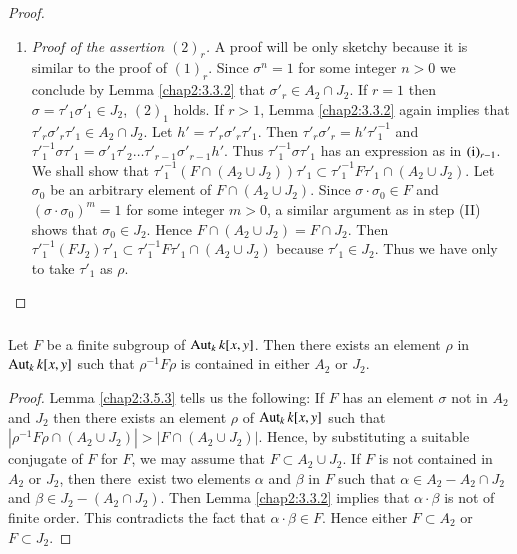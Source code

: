 \begin{proof}
\begin{enumerate}
\item {\em Proof of the assertion $(2)_{r}$.} A proof will be only
  sketchy because it is similar to the proof of $(1)_{r}$. Since
  $\sigma^{n}=1$ for some integer $n>0$ we conclude by Lemma
  \ref{chap2:3.3.2} that $\sigma'_{r}\in A_{2}\cap J_{2}$. If $r=1$ then
  $\sigma=\tau'_{1}\sigma'_{1}\in J_{2}$, \iec $(2)_{1}$ holds. If
  $r>1$, Lemma \ref{chap2:3.3.2} again implies that
  $\tau'_{r}\sigma'_{r}\tau'_{1}\in A_{2}\cap J_{2}$. Let
  $h'=\tau'_{r}\sigma'_{r}\tau'_{1}$. Then
  $\tau'_{r}\sigma'_{r}=h'{\tau'}^{-1}_{1}$ and
  ${\tau'}^{-1}_{1}\sigma
  \tau'_{1}=\sigma'_{1}\tau'_{2}\ldots\tau'_{r-1}\sigma'_{r-1}h'$. Thus
  ${\tau'}^{-1}_{1}\sigma\tau'_{1}$ has an expression as in $({\rm
    i})_{r-1}$. We shall show that ${\tau'}^{-1}_{1}(F\cap (A_{2}\cup
  J_{2}))\tau'_{1}\subset{\tau'}^{-1}_{1}F\tau'_{1}\cap (A_{2}\cup
  J_{2})$. Let $\sigma_{0}$ be an arbitrary element of $F\cap
  (A_{2}\cup J_{2})$. Since $\sigma\cdot\sigma_{0}\in F$ and
  $(\sigma\cdot\sigma_{0})^{m}=1$ for some integer $m>0$, a similar
  argument as in step (II) shows that $\sigma_{0}\in J_{2}$. Hence
  $F\cap (A_{2}\cup J_{2})=F\cap J_{2}$. Then
  ${\tau'}^{-1}_{1}(FJ_{2})\tau'_{1}\subset
  {\tau'}^{-1}_{1}F\tau'_{1}\cap (A_{2}\cup J_{2})$ because
  $\tau'_{1}\in J_{2}$. Thus we have only to take $\tau'_{1}$ as
  $\rho$.
\end{enumerate}
\end{proof}

\subsubsection{}\label{chap2:3.5.4}
\begin{lemma*}
  Let $F$ be a finite subgroup of $\operatorname{Aut}_{k}k[x,y]$. Then there exists an
  element $\rho$ in $\operatorname{Aut}_{k}k[x,y]$ such that $\rho^{-1}F\rho$ is
  contained in either $A_{2}$ or $J_{2}$.
\end{lemma*}

\begin{proof}
Lemma \ref{chap2:3.5.3} tells us the following: If $F$ has an element
$\sigma$ not in $A_{2}$ and $J_{2}$ then there exists an element
$\rho$ of $\operatorname{Aut}_{k}k[x,y]$ such that $|\rho^{-1}F\rho\cap(A_{2}\cup
J_{2})|>|F\cap (A_{2}\cup J_{2})|$. Hence, by substituting a suitable
conjugate of $F$ for $F$, we may assume that $F\subset A_{2}\cup
J_{2}$. If $F$ is not contained in $A_{2}$ or $J_{2}$, then there\pageoriginale\
exist two elements $\alpha$ and $\beta$ in $F$ such that $\alpha\in
A_{2}-A_{2}\cap J_{2}$ and $\beta\in J_{2}-(A_{2}\cap J_{2})$. Then
Lemma \ref{chap2:3.3.2} implies that $\alpha\cdot \beta$ is not of finite
order. This contradicts the fact that $\alpha\cdot \beta\in F$. Hence
either $F\subset A_{2}$ or $F\subset J_{2}$.
\end{proof}

